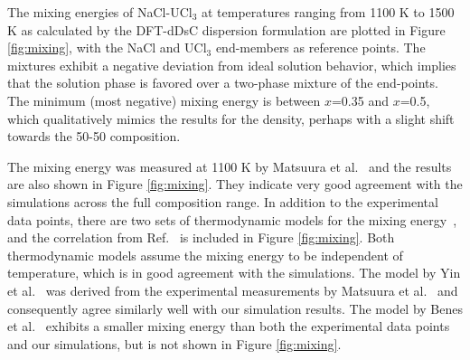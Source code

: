 \documentclass[preprint,3p,10pt,onecolumn,number,sort&compress]{elsarticle}
\begin{document}
{The mixing energies of NaCl-UCl$_3$ at temperatures ranging from 1100 K to 1500 K as calculated by the DFT-dDsC dispersion formulation are plotted in Figure \ref{fig:mixing}, with the NaCl and UCl$_3$ end-members as reference points. The mixtures exhibit a negative deviation from ideal solution behavior, which implies that the solution phase is favored over a two-phase mixture of the end-points. 
 The minimum (most negative) mixing energy is between $x$=0.35 and $x$=0.5, which qualitatively mimics the results for the density, perhaps with a slight shift towards the 50-50 composition. %
 
 The mixing energy was measured at 1100 K by Matsuura et al.~\cite{Matsuura} and the results are also shown in Figure \ref{fig:mixing}. They indicate very good agreement with the simulations across the full composition range. In addition to the experimental data points, there are two sets of thermodynamic models for the mixing energy~\cite{BENES2008,YIN2020}, and the correlation from Ref.~\cite{YIN2020} is included in Figure \ref{fig:mixing}. Both thermodynamic models assume the mixing energy to be independent of temperature, which is in good agreement with the simulations. The model by Yin et al.~\cite{YIN2020} was derived from the experimental measurements by Matsuura et al.~\cite{Matsuura} and consequently agree similarly well with our simulation results. The model by Benes et al.~\cite{BENES2008} exhibits a smaller mixing energy than both the experimental data points and our simulations, but is not shown in Figure \ref{fig:mixing}. 


}
\end{document}
